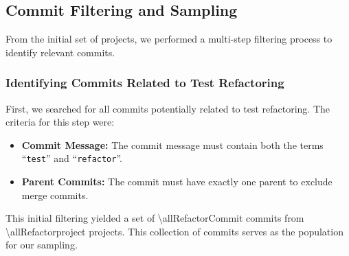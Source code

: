 





\subsection{Commit Filtering and Sampling}
From the initial set of projects, we performed a multi-step filtering process to identify relevant commits.

\subsubsection{Identifying Commits Related to Test Refactoring}
\label{subsub:IdentifyCommit}
First, we searched for all commits potentially related to test refactoring. The criteria for this step were:
\begin{itemize}
    \item \textbf{Commit Message:} The commit message must contain both the terms ``\texttt{test}'' and ``\texttt{refactor}''.
    \item \textbf{Parent Commits:} The commit must have exactly one parent to exclude merge commits.
\end{itemize}
This initial filtering yielded a set of \num{\allRefactorCommit} commits from \num{\allRefactorproject} projects. This collection of commits serves as the population for our sampling.

